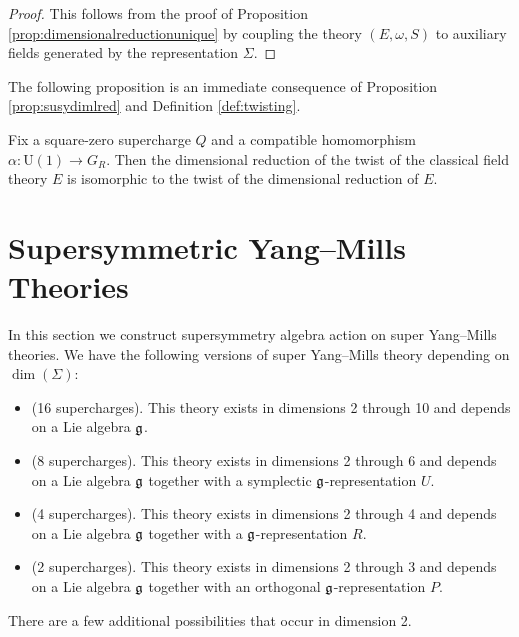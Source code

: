 \documentclass[10pt, oneside]{article}
\renewcommand{\U}{\mathrm{U}}
\begin{document}
\begin{proof}
This follows from the proof of Proposition \ref{prop:dimensionalreductionunique} by coupling the theory $(E, \omega, S)$ to auxiliary fields generated by the representation $\Sigma$.
\end{proof}

The following proposition is an immediate consequence of Proposition \ref{prop:susydimlred} and Definition \ref{def:twisting}.

\begin{prop}
Fix a square-zero supercharge $Q$ and a compatible homomorphism $\alpha\colon \U(1)\rightarrow G_R$. Then the dimensional reduction of the twist of the classical field theory $E$ is isomorphic to the twist of the dimensional reduction of $E$.
\label{prop:twistdimensionalreduction}
\end{prop}

\section{Supersymmetric Yang--Mills Theories} \label{sect:SYM}

In this section we construct supersymmetry algebra action on super Yang--Mills theories. We have the following versions of super Yang--Mills theory depending on $\dim(\Sigma)$:
\begin{itemize}
\item (16 supercharges). This theory exists in dimensions 2 through 10 and depends on a Lie algebra $\mathfrak g$.

\item (8 supercharges). This theory exists in dimensions 2 through 6 and depends on a Lie algebra $\mathfrak g$ together with a symplectic $\mathfrak g$-representation $U$.

\item (4 supercharges). This theory exists in dimensions 2 through 4 and depends on a Lie algebra $\mathfrak g$ together with a $\mathfrak g$-representation $R$.

\item (2 supercharges). This theory exists in dimensions 2 through 3 and depends on a Lie algebra $\mathfrak g$ together with an orthogonal $\mathfrak g$-representation $P$.
\end{itemize}

There are a few additional possibilities that occur in dimension 2.
\end{document}
